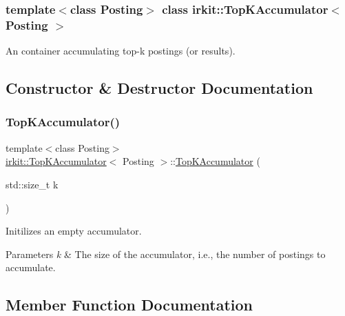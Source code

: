 \subsubsection*{template$<$class Posting$>$\newline
class irkit\+::\+Top\+K\+Accumulator$<$ Posting $>$}

An container accumulating top-\/k postings (or results). 

\subsection{Constructor \& Destructor Documentation}
\mbox{\label{classirkit_1_1TopKAccumulator_a74e1ee880b5d081bc0a3ba0e7fcdb1e3}} 
\subsubsection{\texorpdfstring{Top\+K\+Accumulator()}{TopKAccumulator()}}
{\footnotesize\ttfamily template$<$class Posting$>$ \\
\hyperlink{classirkit_1_1TopKAccumulator}{irkit\+::\+Top\+K\+Accumulator}$<$ Posting $>$\+::\hyperlink{classirkit_1_1TopKAccumulator}{Top\+K\+Accumulator} (\begin{DoxyParamCaption}\item[{std\+::size\+\_\+t}]{k }\end{DoxyParamCaption})\hspace{0.3cm}{\ttfamily [inline]}}



Initilizes an empty accumulator. 


\begin{DoxyParams}{Parameters}
{\em k} & The size of the accumulator, i.\+e., the number of postings to accumulate. \\
\hline
\end{DoxyParams}


\subsection{Member Function Documentation}
\mbox{\label{classirkit_1_1TopKAccumulator_a6caae6de2f8f555b4ad728d8819d1633}} 

